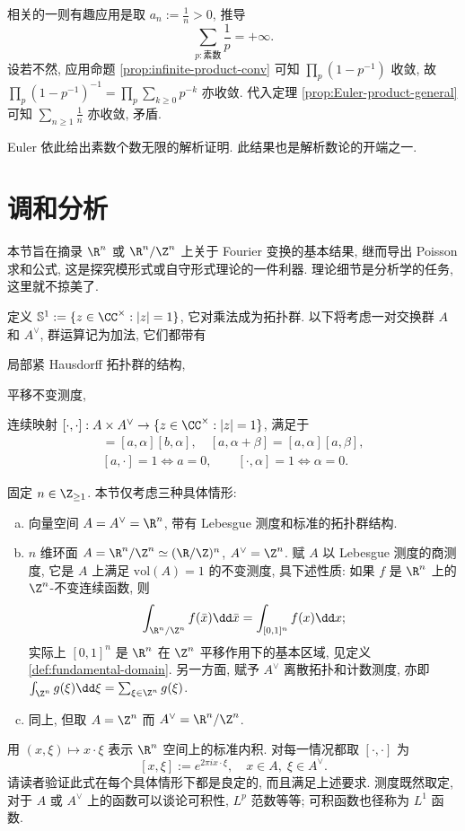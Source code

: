 相关的一则有趣应用是取 $a_n := \frac{1}{n} > 0$, 推导
\[ \sum_{p: \text{素数}} \frac{1}{p} = +\infty. \]
设若不然, 应用命题 \ref{prop:infinite-product-conv} 可知 $\prod_p (1 - p^{-1})$ 收敛, 故 $\prod_p (1 - p^{-1})^{-1} = \prod_p \sum_{k \geq 0} p^{-k}$ 亦收敛. 代入定理 \ref{prop:Euler-product-general} 可知 $\sum_{n \geq 1} \frac{1}{n}$ 亦收敛, 矛盾.

Euler 依此给出素数个数无限的解析证明. 此结果也是解析数论的开端之一.

\section{调和分析}\label{sec:Poisson}
本节旨在摘录 $\R^n$ 或 $\R^n/\Z^n$ 上关于 Fourier 变换的基本结果, 继而导出 Poisson 求和公式, 这是探究模形式或自守形式理论的一件利器. 理论细节是分析学的任务, 这里就不掠美了.

定义 $\mathbb{S}^1 := \{z \in \CC^\times: |z|=1 \}$, 它对乘法成为拓扑群. 以下将考虑一对交换群 $A$ 和 $A^\vee$, 群运算记为加法, 它们都带有
\begin{compactitem}
	\item 局部紧 Hausdorff 拓扑群的结构,
	\item 平移不变测度,
	\item 连续映射 $[\cdot, \cdot]: A \times A^\vee \to \{z \in \CC^\times : |z| = 1 \}$, 满足于
	\begin{gather*}
		[a + b, \alpha] = [a, \alpha] [b, \alpha], \quad [a, \alpha+\beta] = [a,\alpha] [a,\beta], \\
		[a, \cdot] = 1 \iff a=0, \qquad [\cdot, \alpha]=1 \iff \alpha=0.
	\end{gather*}
\end{compactitem}
固定 $n \in \Z_{\geq 1}$. 本节仅考虑三种具体情形:
\begin{enumerate}[(a)]
	\item 向量空间 $A = A^\vee = \R^n$, 带有 Lebesgue 测度和标准的拓扑群结构.
	\item $n$ 维环面 $A = \R^n/\Z^n \simeq (\R/\Z)^n$, $A^\vee = \Z^n$. 赋 $A$ 以 Lebesgue 测度的商测度, 它是 $A$ 上满足 $\text{vol}(A)=1$ 的不变测度, 具下述性质: 如果 $f$ 是 $\R^n$ 上的 $\Z^n$-不变连续函数, 则
	\begin{equation}\label{eqn:quotient-measure}
		\int_{\R^n/\Z^n} f(\bar{x}) \dd\bar{x} = \int_{[0,1]^n} f(x) \dd x ;
	\end{equation}
	实际上 $[0,1]^n$ 是 $\R^n$ 在 $\Z^n$ 平移作用下的基本区域, 见定义 \ref{def:fundamental-domain}. 另一方面, 赋予 $A^\vee$ 离散拓扑和计数测度, 亦即 $\int_{\Z^n} g(\xi) \dd\xi = \sum_{\xi \in \Z^n} g(\xi)$.
	\item 同上, 但取 $A = \Z^n$ 而 $A^\vee = \R^n/\Z^n$.
\end{enumerate}
用 $(x, \xi) \mapsto x \cdot \xi$ 表示 $\R^n$ 空间上的标准内积. 对每一情况都取 $[\cdot, \cdot]$ 为
\[ [x, \xi] := e^{2\pi i x \cdot \xi}, \quad x \in A, \; \xi \in A^\vee. \]
请读者验证此式在每个具体情形下都是良定的, 而且满足上述要求. 测度既然取定, 对于 $A$ 或 $A^\vee$ 上的函数可以谈论可积性, $L^p$ 范数等等; 可积函数也径称为 $L^1$ 函数. 


